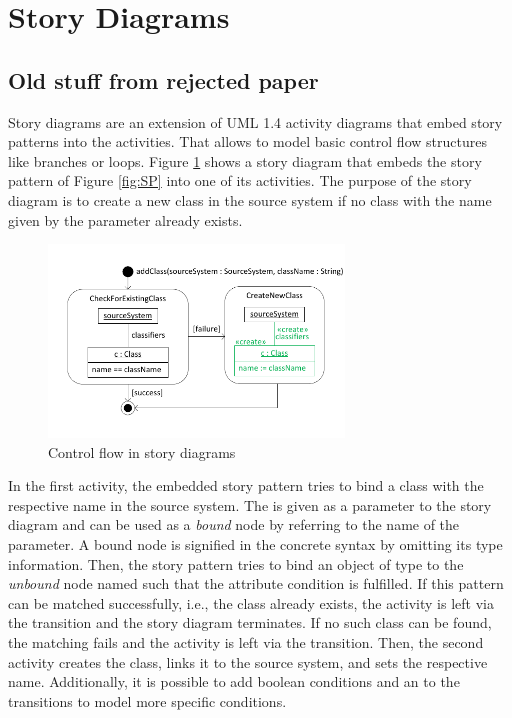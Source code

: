 \section{Story Diagrams} \label{sec:StoryDiagrams}

\subsection*{Old stuff from rejected paper}
Story diagrams are an extension of UML 1.4 activity diagrams \cite{UML} that embed story patterns into the activities.
That allows to model basic control flow structures like branches or loops.
Figure \ref{fig:controlFlow} shows a story diagram that embeds the story pattern of Figure \ref{fig:SP} into one of its activities.
The purpose of the story diagram is to create a new class in the source system if no class with the name given by the parameter  already exists. 

\begin{figure}[tbp]
\begin{center}
  \includegraphics[width=0.7\textwidth]{figures/ControlFlow}
  \caption{Control flow in story diagrams}
  \label{fig:controlFlow}
\end{center}
\end{figure}

In the first activity, the embedded story pattern tries to bind a class with the respective name in the source system. The  is given as a parameter to the story diagram and can be used as a \emph{bound} node by referring to the name of the parameter. A bound node is signified in the concrete syntax by omitting its type information. Then, the story pattern tries to bind an object of type  to the \emph{unbound} node named  such that the attribute condition is fulfilled. 
If this pattern can be matched successfully, i.e., the class already exists, the activity is left via the \fe{[success]} transition and the story diagram terminates.
If no such class can be found, the matching fails and the activity is left via the \fe{[failure]} transition.
Then, the second activity creates the class, links it to the source system, and sets the respective name. 
Additionally, it is possible to add boolean conditions and an \fe{[else]} to the transitions to model more specific conditions.

